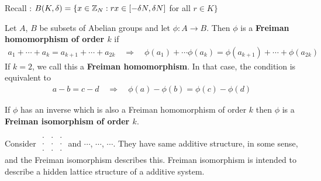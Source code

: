 \documentclass[12pt,a4paper]{report}
\begin{document}
Recall : $B(K,\delta) = \{x\in \mathbb{Z}_N : rx\in [-\delta N, \delta N]$ for all $r\in K \}$
\s

 Let $A$, $B$ be subsets of Abelian groups and let $\phi : A\rightarrow B$. Then $\phi$ is a \textbf{Freiman homomorphism of order $k$} if
\begin{align*}
a_1 + \cdots + a_k = a_{k+1} + \cdots + a_{2k} \quad \Rightarrow \quad \phi(a_1) + \cdots \phi(a_k) = \phi(a_{k+1}) +\cdots +\phi(a_{2k})
\end{align*}
If $k=2$, we call this a \textbf{Freiman homomorphism}. In that case, the condition is equivalent to
\begin{align*}
a-b = c-d \quad \Rightarrow \quad \phi(a) - \phi(b) = \phi(c) - \phi(d)
\end{align*}

\quad If $\phi$ has an inverse which is also a Freiman homomorphism of order $k$ then $\phi$ is a \textbf{Freiman isomorphism of order $k$}.


\s

Consider \quad $\begin{matrix}
\cdot & \cdot & \cdot \\
\cdot & \cdot & \cdot \\
\cdot & \cdot & \cdot
\end{matrix}
$ \quad and $\cdots$, $\cdots$, $\cdots$. They have same additive structure, in some sense, and the Freiman isomorphism describes this. Freiman isomorphism is intended to describe a hidden lattice structure of a additive system.
\s

\renewcommand{\vec}{\underline}
\end{document}
